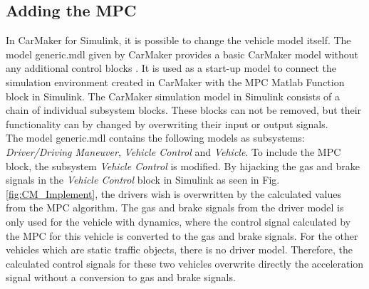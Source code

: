 \documentclass[letterpaper,10pt,conference]{ieeeconf}
\begin{document}
\subsection{Adding the MPC}
In CarMaker for Simulink, it is possible to change the vehicle model itself. The model generic.mdl given by CarMaker provides a basic CarMaker model without any additional control blocks \cite{qsguide}. It is used as a start-up model to connect the simulation environment created in CarMaker with the MPC Matlab Function block in Simulink. The CarMaker simulation model in Simulink consists of a chain of individual subsystem blocks. These blocks can not be removed, but their functionality can by changed by overwriting their input or output signals.\\ \indent
The model generic.mdl contains the following models as subsystems: \textit{Driver/Driving Maneuver}, \textit{Vehicle Control} and \textit{Vehicle}. To include the MPC block, the subsystem \textit{Vehicle Control} is modified.
By hijacking the gas and brake signals in the \textit{Vehicle Control} block in Simulink as seen in Fig. \ref{fig:CM_Implement}, the drivers wish is overwritten by the calculated values from the MPC algorithm. The gas and brake signals from the driver model is only used for the vehicle with dynamics, where the control signal calculated by the MPC for this vehicle is converted to the gas and brake signals. For the other vehicles which are static traffic objects, there is no driver model. Therefore, the calculated control signals for these two vehicles overwrite directly the acceleration signal without a conversion to gas and brake signals.
\end{document}

